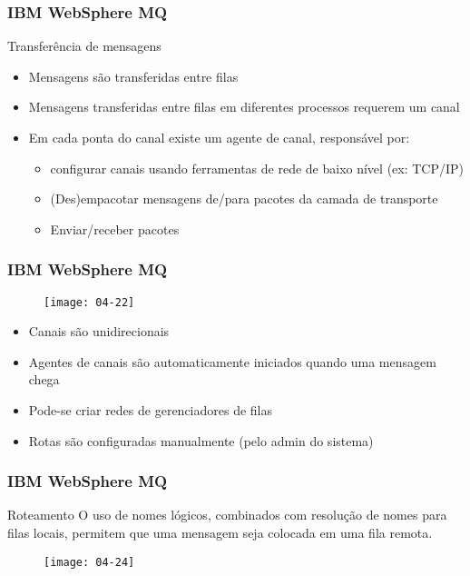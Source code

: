 \documentclass[Ligatures=TeX,table,brazil,svgnames,usetotalslideindicator,compress,10pt]{beamer}
\begin{document}
\begin{frame}
  \frametitle{IBM WebSphere MQ}

  \begin{block}{Transferência de mensagens}
    \begin{itemize}
    \item Mensagens são transferidas entre filas
    \item Mensagens transferidas entre filas em diferentes processos requerem um \alert{canal}
    \item Em cada ponta do canal existe um \alert{agente de canal}, responsável por:
      \begin{itemize}
      \item configurar canais usando ferramentas de rede de baixo nível (ex: TCP/IP)
      \item (Des)empacotar mensagens de/para pacotes da camada de transporte
      \item Enviar/receber pacotes
      \end{itemize}
    \end{itemize}
  \end{block}

\end{frame}

\begin{frame}
  \frametitle{IBM WebSphere MQ}

  \begin{figure}
    \texttt{[image: 04-22]}
  \end{figure}

  \begin{itemize}
  \item Canais são unidirecionais
  \item Agentes de canais são automaticamente iniciados quando uma mensagem chega
  \item Pode-se criar redes de gerenciadores de filas
  \item Rotas são configuradas manualmente (pelo admin do sistema)
  \end{itemize}

\end{frame}

\begin{frame}
  \frametitle{IBM WebSphere MQ}

  \begin{block}{Roteamento}
    O uso de \alert{nomes lógicos}, combinados com resolução de nomes para filas locais, permitem que uma mensagem seja colocada em uma \alert{fila remota}.
  \end{block}

  \begin{figure}
    \texttt{[image: 04-24]}
  \end{figure}

\end{frame}
\end{document}
